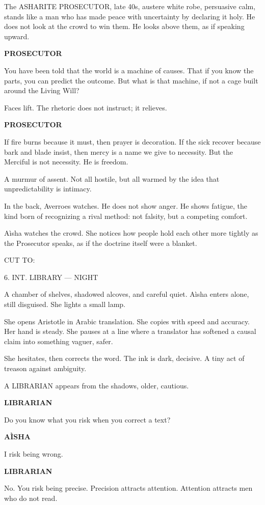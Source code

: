 \documentclass[12pt]{article}
\newlength{\charindent}
\newlength{\dialogueindent}
\newlength{\dialoguewidth}
\newlength{\transitionindent}
\newcommand{\slug}[1]{\vspace{1.25em}\textsc{#1}\vspace{0.5em}}
\newcommand{\action}[1]{#1}
\newcommand{\character}[1]{%
  \par\vspace{0.75em}%
  \hspace*{\charindent}\textbf{#1}%
}
\newcommand{\dialogue}[1]{%
  \par\nobreak
  \hspace*{\dialogueindent}%
  \begin{minipage}[t]{\dialoguewidth}
  #1
  \end{minipage}
}
\newcommand{\transition}[1]{%
  \par\vspace{1em}%
  \hspace*{\transitionindent}\textsc{#1}%
}
\begin{document}
\action{The ASH\textquotesingle ARITE PROSECUTOR, late 40s, austere white robe, persuasive calm, stands like a man who has made peace with uncertainty by declaring it holy. He does not look at the crowd to win them. He looks above them, as if speaking upward.}

\character{PROSECUTOR}
\dialogue{You have been told that the world is a machine of causes. That if you know the parts, you can predict the outcome. But what is that machine, if not a cage built around the Living Will?}

\action{Faces lift. The rhetoric does not instruct; it relieves.}

\character{PROSECUTOR}
\dialogue{If fire burns because it must, then prayer is decoration. If the sick recover because bark and blade insist, then mercy is a name we give to necessity. But the Merciful is not necessity. He is freedom.}

\action{A murmur of assent. Not all hostile, but all warmed by the idea that unpredictability is intimacy.}

\action{In the back, Averroes watches. He does not show anger. He shows fatigue, the kind born of recognizing a rival method: not falsity, but a competing comfort.}

\action{A\`isha watches the crowd. She notices how people hold each other more tightly as the Prosecutor speaks, as if the doctrine itself were a blanket.}

\transition{CUT TO:}

\slug{6. INT. LIBRARY --- NIGHT}

\action{A chamber of shelves, shadowed alcoves, and careful quiet. A\`isha enters alone, still disguised. She lights a small lamp.}

\action{She opens Aristotle in Arabic translation. She copies with speed and accuracy. Her hand is steady. She pauses at a line where a translator has softened a causal claim into something vaguer, safer.}

\action{She hesitates, then corrects the word. The ink is dark, decisive. A tiny act of treason against ambiguity.}

\action{A LIBRARIAN appears from the shadows, older, cautious.}

\character{LIBRARIAN}
\dialogue{Do you know what you risk when you correct a text?}

\character{A\`ISHA}
\dialogue{I risk being wrong.}

\character{LIBRARIAN}
\dialogue{No. You risk being precise. Precision attracts attention. Attention attracts men who do not read.}
\end{document}

